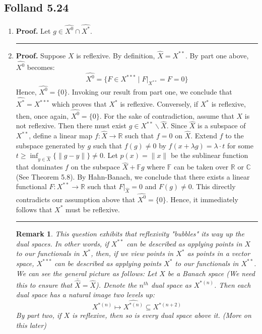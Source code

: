 \documentclass[12pt]{article}%
\newtheorem{remark}[theorem]{Remark}
\newenvironment{proof}[1][Proof]{\textbf{#1.} }{\ \rule{0.5em}{0.5em}}
\newcommand{\R}{\mathbb{R}}
\newcommand{\C}{\mathbb{C}}
\begin{document}
\subsection{Folland 5.24}
\begin{enumerate}
\item 
\begin{proof}
Let $g \in \widehat{X^0} \cap \widehat{X^*}$.
\end{proof}
\item
\begin{proof}
Suppose $X$ is reflexive. By definition, $\hat{X} = X^{**}$. By part one above, $\widehat{X^0}$ becomes:
$$ \widehat{X^0} = \{ F \in X^{***} \mid F |_{X^{**}} = F = 0 \}$$ Hence, 
$\widehat{X^0} = \{ 0 \}$. Invoking our result from part one, we conclude that $\widehat{X^*} = X^{***}$ which proves that $X^*$ is reflexive. Conversely, if $X^*$ is reflexive, then, once again, $\widehat{X^0} = \{ 0 \}$. For the sake of contradiction, assume that 
$X$ is not reflexive. Then there must exist $g \in X^{**} \backslash \hat{X}$. Since $\hat{X}$ is a subspace of $X^{**}$, define a linear map $f: \hat{X} \rightarrow \R$ such that $f = 0$ on $\hat{X}$. Extend $f$ to the subspace generated by $g$ such that $f(g) \neq 0$ by $f(x + \lambda g) = \lambda \cdot t$ for some $t \geq \inf_{y \in \hat{X}} \{ \|g - y\|\} \neq 0$. Let $p(x) = \| x\|$ be the sublinear function that dominates $f$ on the subspace $\hat{X} + \mathbb{F}g$ where $\mathbb{F}$ can be taken over $\R$ or $\C$ (See Theorem 5.8). By Hahn-Banach, we conclude that there exists a linear functional $F: X^{**} \rightarrow \R$ such that $F|_{\hat{X}} = 0$ and $F(g) \neq 0$. This directly contradicts our assumption above that $\widehat{X^0} = \{ 0 \}$. Hence, it immediately follows that $X^*$ must be reflexive. 
\end{proof}

\begin{remark}
This question exhibits that reflexivity "bubbles" its way up the dual spaces. In other words, if $X^{**}$ can be described as applying points in $X$ to our functionals  in $X^*$, then, if we view points in $X^*$ as points in a vector space, $X^{***}$ can be described as applying points $X^*$ to our functionals in $X^{**}$. We can see the general picture as follows: Let $X$ be a Banach space (We need this to ensure that $\bar{\hat{X}} = \hat{X}$). Denote the $n^{th}$ dual space as $X^{*(n)}$. Then each dual space has a natural image two levels up: 
$$ X^{*(n)} \mapsto \widehat{X^{*(n)}} \subseteq X^{*(n+2)}$$
By part two, if $X$ is reflexive, then so is every dual space above it. (More on this later)
\end{remark}

\end{enumerate}
\end{document}
